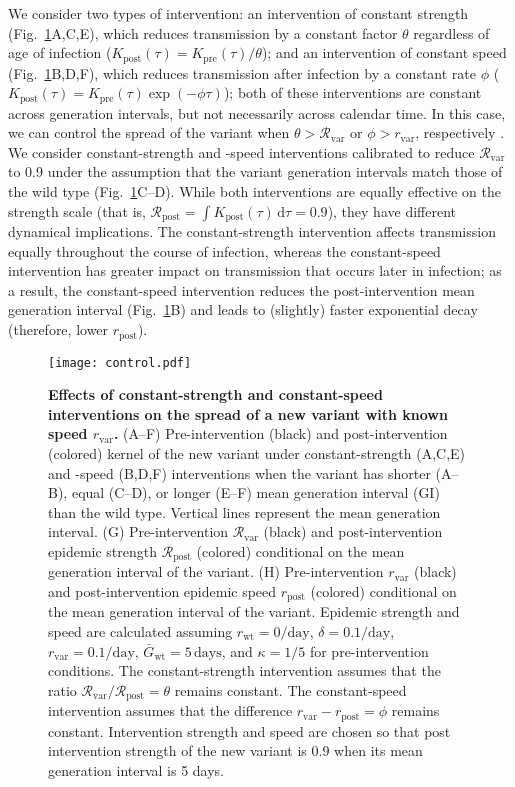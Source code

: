 \documentclass[12pt]{article}
\newcommand{\fref}[1]{Fig.~\ref{fig:#1}}
\newcommand{\vvvar}{\mathrm{var}}
\newcommand{\wwwt}{\mathrm{wt}}
\newcommand{\rx}[1]{\ensuremath{{r}_{#1}}\xspace}
\newcommand{\ry}[1]{\rx{\mathrm{#1}}}
\newcommand{\rw}{\rx{\wwwt}}
\newcommand{\rv}{\rx{\vvvar}}
\newcommand{\Rx}[1]{\ensuremath{{\mathcal R}_{#1}}\xspace}
\newcommand{\Ry}[1]{\Rx{\mathrm{#1}}}
\newcommand{\Rv}{\Rx{\vvvar}}
\newcommand{\pday}{\ensuremath{/\textrm{day}}}
\newcommand{\dd}[1]{\ensuremath{\, \mathrm{d}#1}}
\newcommand{\dtau}{\dd{\tau}}
\newcommand{\Gx}[1]{\ensuremath{{\bar G}_{#1}}\xspace}
\newcommand{\Gy}[1]{\Gx{\mathrm{#1}}}
\begin{document}
We consider two types of intervention:
an intervention of constant strength (\fref{strengthspeed}A,C,E), which reduces transmission by a constant factor $\theta$ regardless of age of infection ($K_{\mathrm{post}}(\tau) = K_{\mathrm{pre}}(\tau)/\theta$); and an intervention of constant speed (\fref{strengthspeed}B,D,F), which reduces transmission after infection by a constant rate $\phi$ ($K_{\mathrm{post}}(\tau) = K_{\mathrm{pre}}(\tau) \exp(-\phi \tau)$);
both of these interventions are constant across generation intervals, but not necessarily across calendar time. 
In this case, we can control the spread of the variant when $\theta > \Rv$ or $\phi > \rv$, respectively \citep{doi:10.1098/rspb.2020.1556}.
We consider constant-strength and -speed interventions calibrated to reduce $\Rv$ to 0.9 under the assumption that the variant generation intervals match those of the wild type (\fref{strengthspeed}C--D).
While both interventions are equally effective on the strength scale (that is, $\Ry{post}=\int K_{\mathrm{post}}(\tau) \dtau = 0.9$), they have different dynamical implications.
The constant-strength intervention affects transmission equally throughout the course of infection, whereas the constant-speed intervention has greater impact on transmission that occurs later in infection;
as a result, the constant-speed intervention reduces the post-intervention mean generation interval (\fref{strengthspeed}B) and leads to (slightly) faster exponential decay (therefore, lower $\ry{post}$).

\begin{figure}[!pth]
\begin{center}
\texttt{[image: control.pdf]}
\caption{
\textbf{Effects of constant-strength and constant-speed interventions on the spread of a new variant with known speed \rv.}
(A--F) Pre-intervention (black) and post-intervention (colored) kernel of the new variant under constant-strength (A,C,E) and -speed (B,D,F) interventions when the variant has shorter (A--B), equal (C--D), or longer (E--F) mean generation interval (GI) than the wild type.
Vertical lines represent the mean generation interval.
(G) Pre-intervention $\Rv$ (black) and post-intervention epidemic strength $\Ry{post}$ (colored) conditional on the mean generation interval of the variant.
(H) Pre-intervention $\rv$ (black) and post-intervention epidemic speed $\ry{post}$ (colored) conditional on the mean generation interval of the variant.
Epidemic strength and speed are calculated assuming $\rw=0\pday$, $\delta=0.1\pday$, $\rv=0.1\pday$, $\Gy{wt}=5\,\textrm{days}$, and $\kappa=1/5$ for pre-intervention conditions.
The constant-strength intervention assumes that the ratio $\Rv/\Ry{post} = \theta$ remains constant.
The constant-speed intervention assumes that the difference $\rv - \ry{post} = \phi$ remains constant.
Intervention strength and speed are chosen so that post intervention strength of the new variant is 0.9 when its mean generation interval is 5 days.
}
\label{fig:strengthspeed}
\end{center}
\end{figure}
\end{document}

